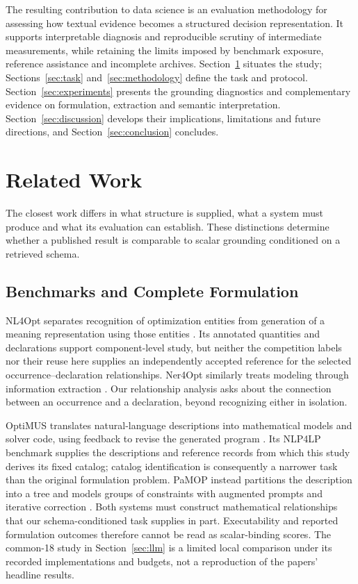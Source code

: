 \documentclass[pdflatex,iicol,sn-basic,Numbered]{sn-jnl}
\begin{document}
The resulting contribution to data science is an evaluation methodology for assessing how textual evidence becomes a structured decision representation. It supports interpretable diagnosis and reproducible scrutiny of intermediate measurements, while retaining the limits imposed by benchmark exposure, reference assistance and incomplete archives. Section~\ref{sec:related_work} situates the study; Sections~\ref{sec:task} and~\ref{sec:methodology} define the task and protocol. Section~\ref{sec:experiments} presents the grounding diagnostics and complementary evidence on formulation, extraction and semantic interpretation. Section~\ref{sec:discussion} develops their implications, limitations and future directions, and Section~\ref{sec:conclusion} concludes.

\section{Related Work}
\label{sec:related_work}
The closest work differs in what structure is supplied, what a system must produce and what its evaluation can establish. These distinctions determine whether a published result is comparable to scalar grounding conditioned on a retrieved schema.

\subsection{Benchmarks and Complete Formulation}
\label{subsec:rw_llm_generation}
NL4Opt separates recognition of optimization entities from generation of a meaning representation using those entities \cite{ramamonjison2023nl4opt}. Its annotated quantities and declarations support component-level study, but neither the competition labels nor their reuse here supplies an independently accepted reference for the selected occurrence--declaration relationships. Ner4Opt similarly treats modeling through information extraction \cite{kadioglu2024ner4opt}. Our relationship analysis asks about the connection between an occurrence and a declaration, beyond recognizing either in isolation.

OptiMUS translates natural-language descriptions into mathematical models and solver code, using feedback to revise the generated program \cite{ahmaditeshnizi2024optimus_icml}. Its NLP4LP benchmark supplies the descriptions and reference records from which this study derives its fixed catalog; catalog identification is consequently a narrower task than the original formulation problem. PaMOP instead partitions the description into a tree and models groups of constraints with augmented prompts and iterative correction \cite{pan2025pamop}. Both systems must construct mathematical relationships that our schema-conditioned task supplies in part. Executability and reported formulation outcomes therefore cannot be read as scalar-binding scores. The common-18 study in Section~\ref{sec:llm} is a limited local comparison under its recorded implementations and budgets, not a reproduction of the papers' headline results.
\end{document}
